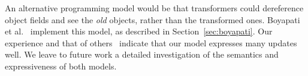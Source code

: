 An alternative programming model would be that transformers could dereference
\FROM object fields and see the \emph{old} objects, rather than the
transformed ones.  Boyapati et al.~\cite{boyapati03lazy} implement this
model, as described in Section~\ref{sec:boyapati}. Our experience and that of
others~\cite{k42usenix,neamtiu06dsu,neamtiu09stump,upstare} indicate
that our model expresses many updates well.  We leave to future work a
detailed investigation of the semantics and expressiveness of both
models.
